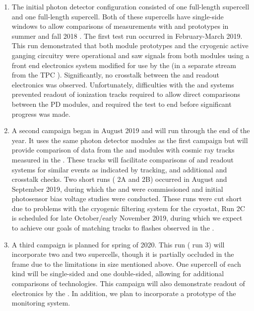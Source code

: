 \begin{enumerate}
    \item The initial photon detector configuration consisted of one full-length  supercell and one full-length  supercell.  Both of these supercells have single-side windows to allow comparisons of measurements with  and  prototypes in summer and fall 2018 .  
    The first test run occurred in February-March 2019. This run demonstrated that both module prototypes and the cryogenic active ganging circuitry were operational and saw signals from both modules using a  front end electronics system modified for use by the   (in a separate stream from the TPC ). Significantly, no crosstalk between the  and  readout electronics was observed.  Unfortunately, difficulties with the   and  systems prevented readout of ionization tracks required to allow direct comparisons between the PD modules, and required the test to end before significant progress was made.


    \item A second campaign began in August 2019 and will run through the end of the year. It uses the same photon detector modules as the first campaign but will provide comparison of data from the  and  modules with cosmic ray tracks measured in the .  These tracks will facilitate comparisons of  and  readout systems for similar events as indicated by  tracking, and additional  and  crosstalk checks.  Two short runs ( 2A and 2B) occurred in August and September 2019, during which the  and  were commissioned and initial photosensor bias voltage studies were conducted.  These runs were cut short due to problems with the cryogenic filtering system for the  cryostat,  Run 2C is scheduled for late October/early November 2019, during which we expect to achieve our goals of matching  tracks to flashes observed in the .

    \item A third campaign is planned for spring of 2020.  This run ( run 3) will incorporate two  and two  supercells, though it is partially occluded in the frame due to the limitations in  size mentioned above.  One supercell of each kind will be single-sided and one double-sided, allowing for additional comparisons of  technologies.  This campaign will also demonstrate readout of  electronics by the  .  In addition, we plan to incorporate a prototype of the   monitoring system.
    
\end{enumerate}

